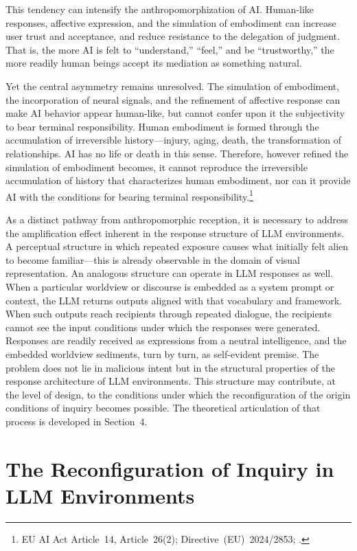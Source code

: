 \documentclass[12pt]{article}
\begin{document}
This tendency can intensify the anthropomorphization of AI. Human-like responses, affective expression, and the simulation of embodiment can increase user trust and acceptance, and reduce resistance to the delegation of judgment. That is, the more AI is felt to ``understand,'' ``feel,'' and be ``trustworthy,'' the more readily human beings accept its mediation as something natural.

Yet the central asymmetry remains unresolved. The simulation of embodiment, the incorporation of neural signals, and the refinement of affective response can make AI behavior appear human-like, but cannot confer upon it the subjectivity to bear terminal responsibility. Human embodiment is formed through the accumulation of irreversible history---injury, aging, death, the transformation of relationships. AI has no life or death in this sense. Therefore, however refined the simulation of embodiment becomes, it cannot reproduce the irreversible accumulation of history that characterizes human embodiment, nor can it provide AI with the conditions for bearing terminal responsibility.\footnote{EU AI Act Article~14, Article~26(2); Directive~(EU)~2024/2853; \citet{santonideio2018}.}

As a distinct pathway from anthropomorphic reception, it is necessary to address the amplification effect inherent in the response structure of LLM environments. A perceptual structure in which repeated exposure causes what initially felt alien to become familiar---this is already observable in the domain of visual representation. An analogous structure can operate in LLM responses as well. When a particular worldview or discourse is embedded as a system prompt or context, the LLM returns outputs aligned with that vocabulary and framework. When such outputs reach recipients through repeated dialogue, the recipients cannot see the input conditions under which the responses were generated. Responses are readily received as expressions from a neutral intelligence, and the embedded worldview sediments, turn by turn, as self-evident premise. The problem does not lie in malicious intent but in the structural properties of the response architecture of LLM environments. This structure may contribute, at the level of design, to the conditions under which the reconfiguration of the origin conditions of inquiry becomes possible. The theoretical articulation of that process is developed in Section~4.

\section{The Reconfiguration of Inquiry in LLM Environments}
\end{document}
